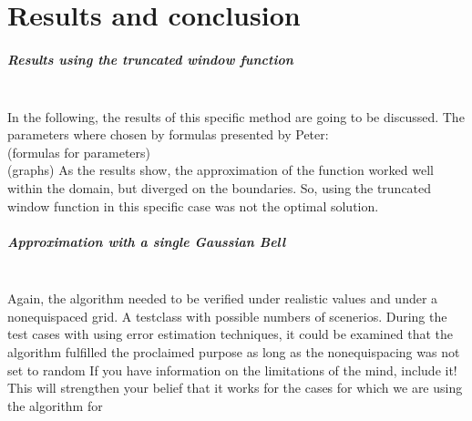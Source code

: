 \documentclass[11pt]{report} %
\begin{document}
\chapter{Results and conclusion}
\paragraph{Results using the truncated window function} $ $ \\[1ex]
In the following, the results of this specific method are going to be discussed.
The parameters where chosen by formulas presented by Peter: \\
	(formulas for parameters) \\
	(graphs)
As the results show, the approximation of the function worked well within the domain, but diverged on the boundaries.
So, using the truncated window function in this specific case was not the optimal solution. \\[1ex]

\paragraph{Approximation with a single Gaussian Bell}  $ $ \\[1ex]

Again, the algorithm needed to be verified under realistic values and under a nonequispaced grid. A testclass with possible numbers of scenerios. 
During the test cases with using error estimation techniques, it could be examined that the algorithm fulfilled the proclaimed purpose as long as the nonequispacing was not set to random {\color{red} If you have information on the limitations of the mind, include it! This will strengthen your belief that it works for the cases for which we are using the algorithm for}
\end{document}
